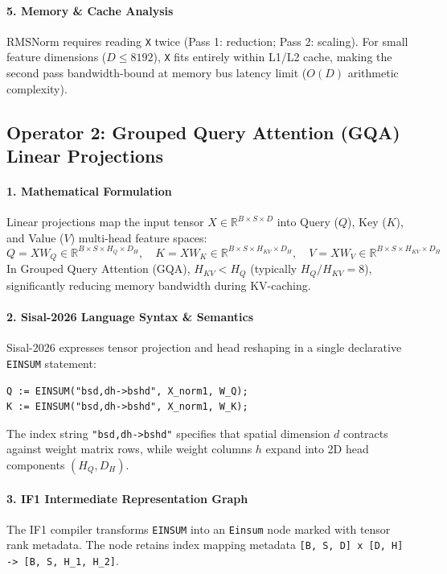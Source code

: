 \paragraph{5. Memory \& Cache Analysis}
RMSNorm requires reading \texttt{X} twice (Pass 1: reduction; Pass 2: scaling). For small feature dimensions ($D \le 8192$), \texttt{X} fits entirely within L1/L2 cache, making the second pass bandwidth-bound at memory bus latency limit ($O(D)$ arithmetic complexity).

\subsection{Operator 2: Grouped Query Attention (GQA) Linear Projections}
\label{subsec:op_gqa_proj}

\paragraph{1. Mathematical Formulation}
Linear projections map the input tensor $X \in \mathbb{R}^{B \times S \times D}$ into Query ($Q$), Key ($K$), and Value ($V$) multi-head feature spaces:
\begin{equation}
Q = X W_Q \in \mathbb{R}^{B \times S \times H_Q \times D_H}, \quad
K = X W_K \in \mathbb{R}^{B \times S \times H_{KV} \times D_H}, \quad
V = X W_V \in \mathbb{R}^{B \times S \times H_{KV} \times D_H}
\end{equation}
In Grouped Query Attention (GQA), $H_{KV} < H_Q$ (typically $H_Q / H_{KV} = 8$), significantly reducing memory bandwidth during KV-caching.

\paragraph{2. Sisal-2026 Language Syntax \& Semantics}
Sisal-2026 expresses tensor projection and head reshaping in a single declarative \texttt{EINSUM} statement:
\begin{lstlisting}[language=Sisal]
Q := EINSUM("bsd,dh->bshd", X_norm1, W_Q);
K := EINSUM("bsd,dh->bshd", X_norm1, W_K);
\end{lstlisting}
The index string \texttt{"bsd,dh->bshd"} specifies that spatial dimension $d$ contracts against weight matrix rows, while weight columns $h$ expand into 2D head components $(H_Q, D_H)$.

\paragraph{3. IF1 Intermediate Representation Graph}
The IF1 compiler transforms \texttt{EINSUM} into an \texttt{Einsum} node marked with tensor rank metadata. The node retains index mapping metadata \texttt{[B, S, D] x [D, H] -> [B, S, H\_1, H\_2]}.

